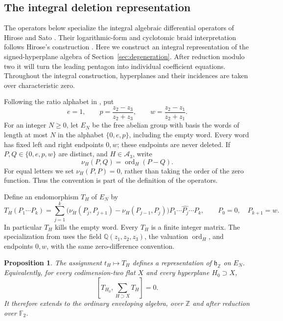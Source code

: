 \documentclass[11pt]{article}
\newtheorem{proposition}[theorem]{Proposition}
\theoremstyle{definition}
\theoremstyle{remark}
\numberwithin{equation}{section}
\begin{document}
\subsection{The integral deletion representation}
The operators below specialize the integral algebraic differential
operators of Hirose and Sato \cite[Section~2]{HiroseSato}.
Their logarithmic-form and cyclotomic braid interpretation follows
Hirose's construction \cite[Section~4.3]{Hirose}.
Here we construct an integral representation of the signed-hyperplane
algebra of Section~\ref{sec:degeneration}.  After reduction modulo two it
will turn the leading pentagon into individual coefficient equations.
Throughout the integral construction, hyperplanes and their incidences
are taken over characteristic zero.

Following the ratio alphabet in \cite[Section~6]{Hirose}, put
\begin{equation}\label{eq:deletion-letters}
 e=1,\qquad
 p=\frac{z_2-z_3}{z_2+z_3},\qquad
 w=\frac{z_2-z_1}{z_2+z_1}.
\end{equation}
For an integer $N\geq0$, let $E_N$ be the free abelian group with basis the
words of length at most $N$ in the alphabet $\{0,e,p\}$, including the
empty word.  Every word has fixed left and right endpoints $0,w$; these
endpoints are never deleted.  If $P,Q\in\{0,e,p,w\}$ are distinct, and
$H\in\mathcal A_3$, write
\[
 \nu_H(P,Q)=\operatorname{ord}_H(P-Q).
\]
For equal letters we set $\nu_H(P,P)=0$, rather than taking the order of
the zero function.  Thus the convention is part of the definition of
the operators.

Define an endomorphism $T_H$ of $E_N$ by
\begin{equation}\label{eq:deletion-operator}
 T_H(P_1\cdots P_k)
 =\sum_{j=1}^{k}
 \bigl(\nu_H(P_j,P_{j+1})-\nu_H(P_{j-1},P_j)\bigr)
 P_1\cdots\widehat{P_j}\cdots P_k,
 \qquad P_0=0,\quad P_{k+1}=w.
\end{equation}
In particular $T_H$ kills the empty word.  Every $T_H$ is a finite
integer matrix.  The specialization from \cite[Section~2]{HiroseSato}
uses the field $\mathbb Q(z_1,z_2,z_3)$, the valuation $\operatorname{ord}_H$,
and endpoints $0,w$, with the same zero-difference convention.

\begin{proposition}\label{prop:deletion-representation}
The assignment $t_H\mapsto T_H$ defines a representation of
$\mathfrak h_{\mathbb Z}$ on $E_N$.  Equivalently, for every codimension-two
flat $X$ and every hyperplane $H_0\supset X$,
\begin{equation}\label{eq:deletion-flat}
 \left[T_{H_0},\sum_{H\supset X}T_H\right]=0.
\end{equation}
It therefore extends to the ordinary enveloping algebra, over $\mathbb Z$ and
after reduction over ${\mathbb F_2}$.
\end{proposition}
\end{document}

